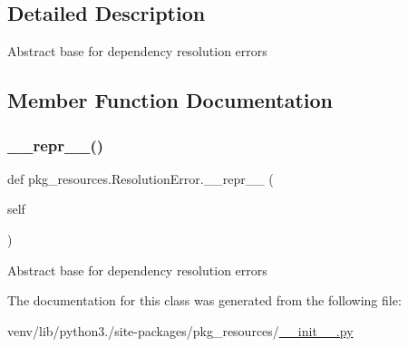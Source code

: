 \subsection{Detailed Description}
\begin{DoxyVerb}Abstract base for dependency resolution errors\end{DoxyVerb}
 

\subsection{Member Function Documentation}
\mbox{\label{classpkg__resources_1_1ResolutionError_a6f7aee7ab8931a20c36cf96c564fcf55}} 
\subsubsection{\texorpdfstring{\+\_\+\+\_\+repr\+\_\+\+\_\+()}{\_\_repr\_\_()}}
{\footnotesize\ttfamily def pkg\+\_\+resources.\+Resolution\+Error.\+\_\+\+\_\+repr\+\_\+\+\_\+ (\begin{DoxyParamCaption}\item[{}]{self }\end{DoxyParamCaption})}

\begin{DoxyVerb}Abstract base for dependency resolution errors\end{DoxyVerb}
 

The documentation for this class was generated from the following file\+:\begin{DoxyCompactItemize}
\item 
venv/lib/python3./site-\/packages/pkg\+\_\+resources/\hyperlink{venv_2lib_2python3_89_2site-packages_2pkg__resources_2____init_____8py}{\+\_\+\+\_\+init\+\_\+\+\_\+.\+py}\end{DoxyCompactItemize}
